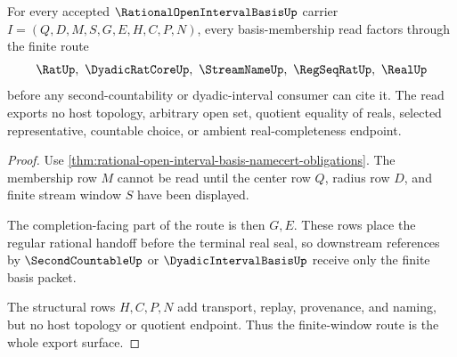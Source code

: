 \begin{theorem}
\label{thm:rational-open-interval-basis-finite-window-nonescape}
For every accepted $\RationalOpenIntervalBasisUp$ carrier $I=(Q,D,M,S,G,E,H,C,P,N)$, every basis-membership read factors through the finite route
$$
\RatUp,\ \DyadicRatCoreUp,\ \StreamNameUp,\ \RegSeqRatUp,\ \RealUp
$$
before any second-countability or dyadic-interval consumer can cite it. The read exports no host topology, arbitrary open set, quotient equality of reals, selected representative, countable choice, or ambient real-completeness endpoint.
\end{theorem}

\begin{proof}
Use \autoref{thm:rational-open-interval-basis-namecert-obligations}. The membership row $M$ cannot be read until the center row $Q$, radius row $D$, and finite stream window $S$ have been displayed.

The completion-facing part of the route is then $G,E$. These rows place the regular rational handoff before the terminal real seal, so downstream references by $\SecondCountableUp$ or $\DyadicIntervalBasisUp$ receive only the finite basis packet.

The structural rows $H,C,P,N$ add transport, replay, provenance, and naming, but no host topology or quotient endpoint. Thus the finite-window route is the whole export surface.
\end{proof}




